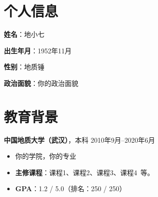 \documentclass[11pt]{article}
\newcommand{\primarycolor}{\color{CUGblue}}
\newlength{\iconwidth}
\begin{document}
    \begin{minipage}[t]{0.78\textwidth}
        \begin{minipage}[t]{\textwidth}
        \section[个人信息]{\makebox[\iconwidth][c]{\primarycolor{\faUser*}}\quad 个人信息}
        \begin{minipage}[t]{0.5\textwidth}
            \textbf{姓\qquad 名}：地小七
            
            \vspace{0.5em}
            \textbf{出生年月}：1952年11月
        \end{minipage}
        \begin{minipage}[t]{0.35\textwidth}
            \textbf{性\qquad 别}：地质锤
            
            \vspace{0.5em}
            \textbf{政治面貌}：你的政治面貌
        \end{minipage}
        \vspace{1.2em}
        \end{minipage}

        \begin{minipage}[t]{\textwidth}
        \section[教育背景]{\makebox[\iconwidth][c]{\primarycolor{\faUniversity}}\quad 教育背景}
        
        
        {\large \textbf{中国地质大学（武汉）}}，本科 \hfill 2010年9月--2020年6月
        \begin{itemize}
            \item 你的学院，你的专业
            \item \textbf{主修课程}：课程1、课程2、课程3、课程4\ 等。
            \item \textbf{GPA}：1.2 / 5.0（排名：250 / 250）
        \end{itemize}
        

\end{minipage}
\end{minipage}
\end{document}
